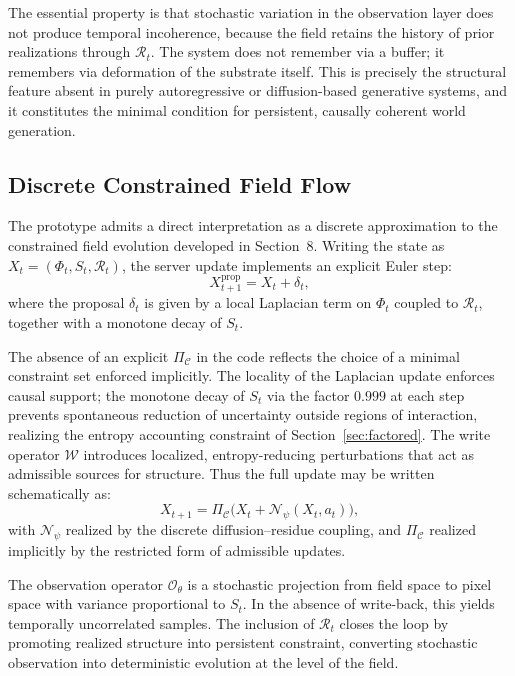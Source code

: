 \documentclass[11pt]{article}
\begin{document}
The essential property is that stochastic variation in the observation
layer does not produce temporal incoherence, because the field retains the
history of prior realizations through $\mathcal{R}_t$.
The system does not remember via a buffer; it remembers via deformation of
the substrate itself.
This is precisely the structural feature absent in purely autoregressive
or diffusion-based generative systems, and it constitutes the minimal
condition for persistent, causally coherent world generation.

\subsection*{Discrete Constrained Field Flow}

The prototype admits a direct interpretation as a discrete approximation
to the constrained field evolution developed in Section~8.
Writing the state as $X_t = (\Phi_t, S_t, \mathcal{R}_t)$, the server
update implements an explicit Euler step:
\[
X_{t+1}^{\mathrm{prop}} = X_t + \delta_t,
\]
where the proposal $\delta_t$ is given by a local Laplacian term on
$\Phi_t$ coupled to $\mathcal{R}_t$, together with a monotone decay of
$S_t$.

The absence of an explicit $\Pi_{\mathcal{C}}$ in the code reflects the
choice of a minimal constraint set enforced implicitly.
The locality of the Laplacian update enforces causal support; the monotone
decay of $S_t$ via the factor $0.999$ at each step prevents spontaneous
reduction of uncertainty outside regions of interaction, realizing the
entropy accounting constraint of Section~\ref{sec:factored}.
The write operator $\mathcal{W}$ introduces localized, entropy-reducing
perturbations that act as admissible sources for structure.
Thus the full update may be written schematically as:
\[
X_{t+1} = \Pi_{\mathcal{C}}\!\big(X_t + \mathcal{N}_\psi(X_t, a_t)\big),
\]
with $\mathcal{N}_\psi$ realized by the discrete diffusion--residue
coupling, and $\Pi_{\mathcal{C}}$ realized implicitly by the restricted
form of admissible updates.

The observation operator $\mathcal{O}_\theta$ is a stochastic projection
from field space to pixel space with variance proportional to $S_t$.
In the absence of write-back, this yields temporally uncorrelated samples.
The inclusion of $\mathcal{R}_t$ closes the loop by promoting realized
structure into persistent constraint, converting stochastic observation
into deterministic evolution at the level of the field.
\end{document}
